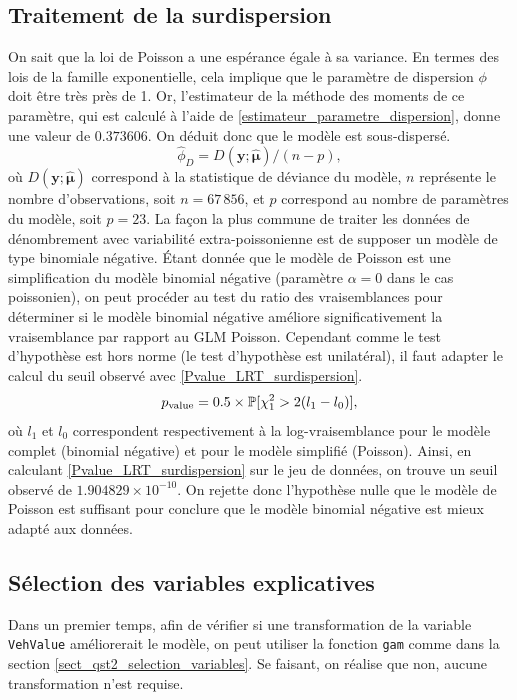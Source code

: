\documentclass{article}
\begin{document}
	\subsection{Traitement de la surdispersion}
	On sait que la loi de Poisson a une espérance égale à sa variance. En termes des lois de la famille exponentielle, cela implique que le paramètre de dispersion $\phi$ doit être très près de 1.
	Or, l'estimateur de la méthode des moments de ce paramètre, qui est calculé à l'aide de \eqref{estimateur_parametre_dispersion}, donne une valeur de $0.373606$. On déduit donc que le modèle est sous-dispersé.
	\begin{equation}\label{estimateur_parametre_dispersion}
		\hat{\phi}_D = D(\boldsymbol{y};\hat{\boldsymbol{\mu}})/(n-p),
	\end{equation}
	où $D(\boldsymbol{y};\hat{\boldsymbol{\mu}})$ correspond à la statistique de déviance du modèle, $n$ représente le nombre d'observations, soit $n=67\,856$, et $p$ correspond au nombre de paramètres du modèle, soit $p=23$.
	La façon la plus commune de traiter les données de dénombrement avec variabilité extra-poissonienne est de supposer un modèle de type binomiale négative.
	Étant donnée que le modèle de Poisson est une simplification du modèle binomial négative (paramètre $\alpha=0$ dans le cas poissonien), on peut procéder au test du ratio des vraisemblances pour déterminer si le modèle binomial négative améliore significativement la vraisemblance par rapport au GLM Poisson. Cependant comme le test d'hypothèse est hors norme (le test d'hypothèse est unilatéral), il faut adapter le calcul du seuil observé avec \eqref{Pvalue_LRT_surdispersion}.
	\begin{equation}\label{Pvalue_LRT_surdispersion}
		p_{\mathrm{value}} = 0.5\times \P[\chi^2_1 > 2(l_1 - l_0)],
	\end{equation}
	où $l_1$ et $l_0$ correspondent respectivement à la log-vraisemblance pour le modèle complet (binomial négative) et pour le modèle simplifié (Poisson).
	Ainsi, en calculant \eqref{Pvalue_LRT_surdispersion} sur le jeu de données, on trouve un seuil observé de 
	$1.904829\times 10^{-10}$. On rejette donc l'hypothèse nulle que le modèle de Poisson est suffisant pour conclure que le modèle binomial négative est mieux adapté aux données.
	
	
	\subsection{Sélection des variables explicatives}
	Dans un premier temps, afin de vérifier si une transformation de la variable \texttt{VehValue} améliorerait le modèle, on peut utiliser la fonction \texttt{gam} comme dans la section \ref{sect_qst2_selection_variables}. Se faisant, on réalise que non, aucune transformation n'est requise.\\
	
\end{document}
